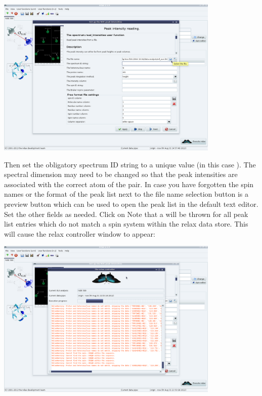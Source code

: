 \begin{minipage}[h]{\linewidth}
\centerline{\includegraphics[width=0.8\textwidth, bb=14 14 1415 1019]{graphics/screenshots/noe_analysis/peak_intensity1}}
\end{minipage}

Then set the obligatory spectrum ID string to a unique value (in this case ).
The spectral dimension may need to be changed so that the peak intensities are associated with the correct atom of the pair.
In case you have forgotten the spin names or the format of the peak list next to the file name selection button is a preview button which can be used to open the peak list in the default text editor.
Set the other fields as needed.
Click on 
Note that a  will be thrown for all peak list entries which do not match a spin system within the relax data store.
This will cause the relax controller window to appear:

\begin{minipage}[h]{\linewidth}
\centerline{\includegraphics[width=0.8\textwidth, bb=14 14 1415 1019]{graphics/screenshots/noe_analysis/peak_intensity2}}
\end{minipage}

